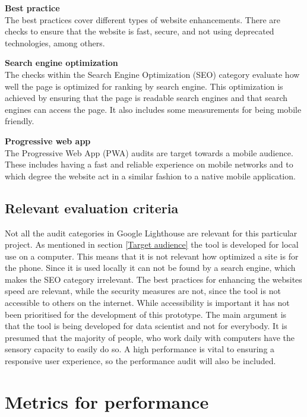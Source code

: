 \citep{LhAccess}

\textbf{Best practice}\\
The best practices cover different types of website enhancements. There are checks to ensure that the website is fast, secure, and not using deprecated technologies, among others. \citep{LhBP}

\textbf{Search engine optimization}\\
The checks within the Search Engine Optimization (SEO) category evaluate how well the page is optimized for ranking by search engine. This optimization is achieved by ensuring that the page is readable search engines and that search engines can access the page. It also includes some measurements for being mobile friendly.
\citep{LhSEO}

\textbf{Progressive web app}\\
The Progressive Web App (PWA) audits are target towards a mobile audience. These includes having a fast and reliable experience on mobile networks and to which degree the website act in a similar fashion to a native mobile application.
\citep{LhPWA}

\subsection{Relevant evaluation criteria}
 
Not all the audit categories in Google Lighthouse are relevant for this particular project. As mentioned in section \ref{Target audience}  the tool is developed for local use on a computer. This means that it is not relevant how optimized a site is for the phone. Since it is used locally it can not be found by a search engine, which makes the SEO category irrelevant. The best practices for enhancing the websites speed are relevant, while the security measures are not, since the tool is not accessible to others on the internet. While accessibility is important it has not been prioritised for the development of this prototype. The main argument is that the tool is being developed for data scientist and not for everybody. It is presumed that the majority of people, who work daily with computers have the sensory capacity to easily do so. A high performance is vital to ensuring a responsive user experience, so the performance audit will also be included.

\section{Metrics for performance}\label{MetricsForPerformance}


